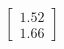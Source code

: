 \documentclass[preview]{standalone}
\begin{document}
\begin{align*}
\begin{bmatrix} 1.52 \\ 1.66 \end{bmatrix}
\end{align*}
\end{document}
